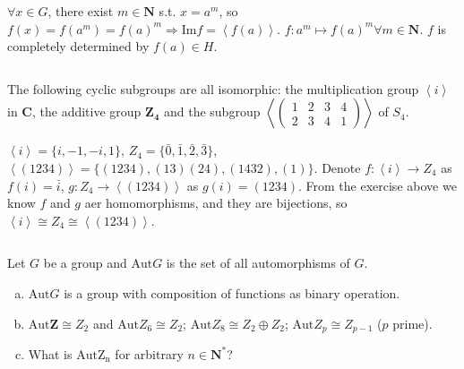 \begin{answer}
    $\forall x\in G$, there exist $m\in \mathbf{N}$ s.t. $x=a^{m}$, so $f(x)=f(a^{m})=f(a)^{m} \Rightarrow \mathrm{Im} f=\left\langle f(a)\right\rangle$. $f:a^{m}\mapsto f(a)^{m} \forall m\in\mathbf{N}$. $f$ is completely determined by $f(a)\in H$.
\end{answer}

$$ $$

\begin{ex}
    The following cyclic subgroups are all isomorphic: the multiplication group $\left\langle i \right\rangle$ in $\mathbf{C}$, the additive group $\mathbf{Z_4}$ and the subgroup $\left\langle \begin{pmatrix}
        1 & 2 & 3 & 4\\
        2 & 3 & 4 & 1
    \end{pmatrix}\right\rangle$ of $S_4$.
\end{ex}

\begin{answer}
    $\left\langle i\right\rangle=\{i,-1,-i,1\}$, $Z_4=\{\bar{0},\bar{1},\bar{2},\bar{3}\}$,\\ $\left\langle(1234)\right\rangle=\{(1234),(13)(24),(1432),(1)\}$.
    Denote $f: \left\langle i\right\rangle\to Z_4$ as $f(i)=\bar{i}$, $g: Z_4\to \left\langle(1234)\right\rangle$ as $g(i)=(1234)$. From the exercise above we know $f$ and $g$ aer homomorphisms, and they are bijections, so $\left\langle i\right\rangle\cong Z_4\cong\left\langle(1234)\right\rangle$.
\end{answer}

$$ $$

\begin{ex}
    Let $G$ be a group and $\mathrm{Aut} G$ is the set of all automorphisms of $G$.
    \begin{enumerate}[(a)]
        \item $\mathrm{Aut} G$ is a group with composition of functions as binary operation.
        \item $\mathrm{Aut} \mathbf{Z}\cong Z_2$ and $\mathrm{Aut} Z_6 \cong Z_2$; $\mathrm{Aut} Z_8\cong Z_2\oplus Z_2$; $\mathrm{Aut} Z_p\cong Z_{p-1}$ ($p$ prime).
        \item What is $\mathrm{Aut Z_n}$ for arbitrary $n\in \mathbf{N^*}$?
    \end{enumerate}
\end{ex}

